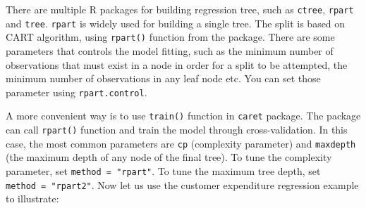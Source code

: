 \documentclass[
  12pt,
]{krantz}
\makeatletter
\newenvironment{Shaded}{\begin{snugshade}}{\end{snugshade}}
\newcommand{\AttributeTok}[1]{\textcolor[rgb]{0.61,0.61,0.61}{#1}}
\newcommand{\CommentTok}[1]{\textcolor[rgb]{0.37,0.37,0.37}{\textit{#1}}}
\newcommand{\DecValTok}[1]{\textcolor[rgb]{0.06,0.06,0.06}{#1}}
\newcommand{\FunctionTok}[1]{\textcolor[rgb]{0,0,0}{#1}}
\newcommand{\NormalTok}[1]{#1}
\newcommand{\OtherTok}[1]{\textcolor[rgb]{0.37,0.37,0.37}{#1}}
\newcommand{\SpecialCharTok}[1]{\textcolor[rgb]{0,0,0}{#1}}
\newcommand{\StringTok}[1]{\textcolor[rgb]{0.5,0.5,0.5}{#1}}
\newenvironment{kframe}{%
\medskip{}
\setlength{\fboxsep}{.8em}
 \def\at@end@of@kframe{}%
 \ifinner\ifhmode%
  \def\at@end@of@kframe{\end{minipage}}%
  \begin{minipage}{\columnwidth}%
 \fi\fi%
 \def\FrameCommand##1{\hskip\@totalleftmargin \hskip-\fboxsep
 \colorbox{shadecolor}{##1}\hskip-\fboxsep
     \hskip-\linewidth \hskip-\@totalleftmargin \hskip\columnwidth}%
 \MakeFramed {\advance\hsize-\width
   \@totalleftmargin\z@ \linewidth\hsize
   \@setminipage}}%
 {\par\unskip\endMakeFramed%
 \at@end@of@kframe}
\renewenvironment{Shaded}{\begin{kframe}}{\end{kframe}}
\makeatother
\begin{document}
There are multiple R packages for building regression tree, such as \texttt{ctree}, \texttt{rpart} and \texttt{tree}. \texttt{rpart} is widely used for building a single tree. The split is based on CART algorithm, using \texttt{rpart()} function from the package. There are some parameters that controls the model fitting, such as the minimum number of observations that must exist in a node in order for a split to be attempted, the minimum number of observations in any leaf node etc. You can set those parameter using \texttt{rpart.control}.

A more convenient way is to use \texttt{train()} function in \texttt{caret} package. The package can call \texttt{rpart()} function and train the model through cross-validation. In this case, the most common parameters are \texttt{cp} (complexity parameter) and \texttt{maxdepth} (the maximum depth of any node of the final tree). To tune the complexity parameter, set \texttt{method\ =\ "rpart"}. To tune the maximum tree depth, set \texttt{method\ =\ "rpart2"}. Now let us use the customer expenditure regression example to illustrate:

\begin{Shaded}
\end{Shaded}
\end{document}
